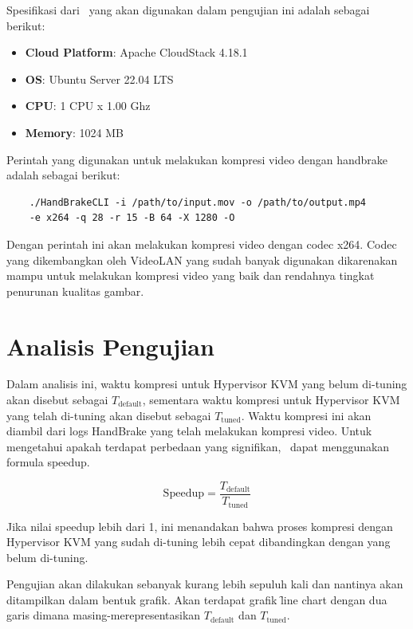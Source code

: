 Spesifikasi dari \vm\ yang akan digunakan dalam pengujian ini adalah sebagai berikut:
\begin{itemize}
    \item \textbf{Cloud Platform}: Apache CloudStack 4.18.1
    \item \textbf{OS}: Ubuntu Server 22.04 LTS
    \item \textbf{CPU}: 1 CPU x 1.00 Ghz
    \item \textbf{Memory}: 1024 MB
\end{itemize} 

Perintah yang digunakan untuk melakukan kompresi video dengan handbrake adalah sebagai berikut:

\begin{verbatim}
    ./HandBrakeCLI -i /path/to/input.mov -o /path/to/output.mp4
    -e x264 -q 28 -r 15 -B 64 -X 1280 -O
\end{verbatim}

Dengan perintah ini \saya akan melakukan kompresi video dengan codec x264. Codec yang dikembangkan oleh VideoLAN yang sudah banyak digunakan dikarenakan mampu untuk melakukan kompresi video yang baik dan rendahnya tingkat penurunan kualitas gambar.

\section{Analisis Pengujian}
Dalam analisis ini, waktu kompresi untuk Hypervisor KVM yang belum di-tuning akan disebut sebagai $T_{\mathrm{default}}$, sementara waktu kompresi untuk Hypervisor KVM yang telah di-tuning akan disebut sebagai $T_{\mathrm{tuned}}$. Waktu kompresi ini akan diambil dari logs HandBrake yang telah melakukan kompresi video. Untuk mengetahui apakah terdapat perbedaan yang signifikan, \saya\ dapat menggunakan formula speedup. 

\[ \mathrm{Speedup} = \frac{T_{\mathrm{default}}}{T_{\mathrm{tuned}}} \]

Jika nilai speedup lebih dari 1, ini menandakan bahwa proses kompresi dengan Hypervisor KVM yang sudah di-tuning lebih cepat dibandingkan dengan yang belum di-tuning. 

Pengujian akan dilakukan sebanyak kurang lebih sepuluh kali dan nantinya akan ditampilkan dalam bentuk grafik. Akan terdapat grafik \f{line chart} dengan dua garis dimana masing-merepresentasikan $T_{\mathrm{default}}$ dan $T_{\mathrm{tuned}}$.

